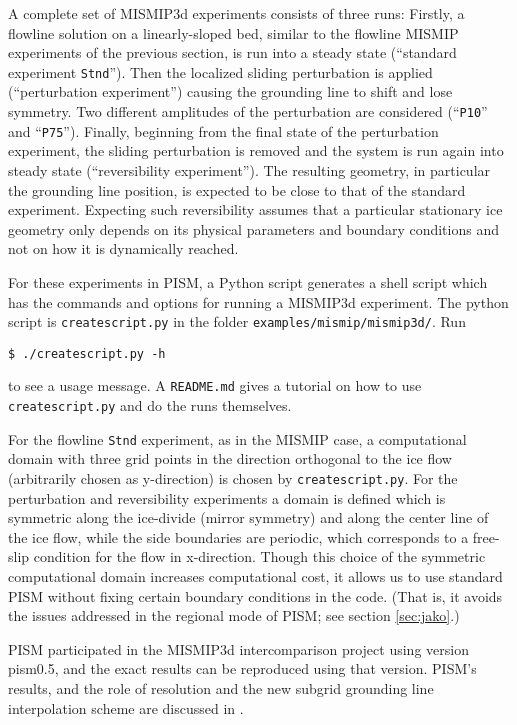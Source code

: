A complete set of MISMIP3d experiments consists of three runs: Firstly, a flowline solution on a linearly-sloped bed, similar to the flowline MISMIP experiments of the previous section, is run into a steady state (``standard experiment \texttt{Stnd}'').  Then the localized sliding perturbation is applied (``perturbation experiment'')  causing the grounding line to shift and lose symmetry.  Two different amplitudes of the perturbation are considered (``\texttt{P10}'' and ``\texttt{P75}'').  Finally, beginning from the final state of the perturbation experiment, the sliding perturbation is removed and the system is run again into steady state (``reversibility experiment'').  The resulting geometry, in particular the grounding line position, is expected to be close to that of the standard experiment.  Expecting such reversibility assumes that a particular stationary ice geometry only depends on its physical parameters and boundary conditions and not on how it is dynamically reached.

For these experiments in PISM, a Python script generates a shell script which has the commands and options for running a MISMIP3d experiment.  The python script is \texttt{createscript.py} in the folder \texttt{examples/mismip/mismip3d/}.  Run

\begin{verbatim}
$ ./createscript.py -h
\end{verbatim}

\noindent to see a usage message.  A \texttt{README.md} gives a tutorial on how to use \texttt{createscript.py} and do the runs themselves.

For the flowline \texttt{Stnd} experiment, as in the MISMIP case, a computational domain with three grid points in the direction orthogonal to the ice flow (arbitrarily chosen as y-direction) is chosen by \texttt{createscript.py}.  For the perturbation and reversibility experiments a domain is defined which is symmetric along the ice-divide (mirror symmetry) and along the center line of the ice flow, while the side boundaries are periodic, which corresponds to a free-slip condition for the flow in x-direction. Though this choice of the symmetric computational domain increases computational cost, it allows us to use standard PISM without fixing certain boundary conditions in the code.  (That is, it avoids the issues addressed in the regional mode of PISM; see section \ref{sec:jako}.)

PISM participated in the MISMIP3d intercomparison project \cite{MISMIP3d2013} using version pism0.5, and the exact results can be reproduced using that version.  PISM's results, and the role of resolution and the new subgrid grounding line interpolation scheme are discussed in \cite{Feldmannetal2014}.

